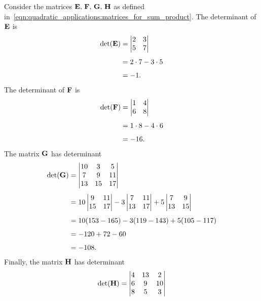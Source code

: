 \documentclass[a4paper,oneside,12pt]{article}
\begin{document}
\begin{problem}
{\begin{solution}
Consider the matrices ${\textbf{E}},\, {\textbf{F}},\, {\textbf{G}},\, {\textbf{H}}$ as
defined
in~\eqref{eqn:quadratic_applications:matrices_for_sum_product}.  The
determinant of $\textbf{E}$ is
\begin{align*}
\det(\textbf{E})
&=
\begin{vmatrix}
2 & 3 \\
5 & 7
\end{vmatrix} \\[4pt]
&=
2 \cdot 7 - 3 \cdot 5 \\[4pt]
&=
-1.
\end{align*}
The determinant of $\textbf{F}$ is
\begin{align*}
\det(\textbf{F})
&=
\begin{vmatrix}
1 & 4 \\
6 & 8
\end{vmatrix} \\[4pt]
&=
1 \cdot 8 - 4 \cdot 6 \\[4pt]
&=
-16.
\end{align*}
The matrix $\textbf{G}$ has determinant
\begin{align*}
\det(\textbf{G})
&=
\begin{vmatrix}
10 & 3  & 5  \\
7  & 9  & 11 \\
13 & 15 & 17
\end{vmatrix} \\[4pt]
&=
10
\begin{vmatrix}
9  & 11 \\
15 & 17
\end{vmatrix}
-
3
\begin{vmatrix}
7  & 11 \\
13 & 17
\end{vmatrix}
+
5
\begin{vmatrix}
7  & 9 \\
13 & 15
\end{vmatrix} \\[4pt]
&=
10(153 - 165) - 3(119 - 143) + 5(105 - 117) \\[4pt]
&=
-120 + 72 - 60 \\[4pt]
&=
-108.
\end{align*}
Finally, the matrix $\textbf{H}$ has determinant
\begin{align*}
\det(\matH)
&=
\begin{vmatrix}
4 & 13 & 2  \\
6 & 9  & 10 \\
8 & 5  & 3
\end{vmatrix} \\[4pt]

\end{align*}
\end{solution}}
\end{problem}
\end{document}
